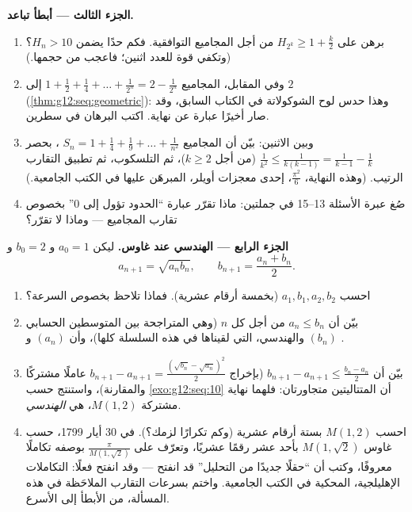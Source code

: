 \begin{problem}
\medskip
\noindent\textbf{الجزء الثالث --- أبطأ تباعد.}
\begin{enumerate}[resume]
  \item برهن  على
        $H_{2^k} \geq 1 + \frac k2$ من أجل المجاميع التوافقية. فكم
        حدًا يضمن $H_n > 10$؟ (وتكفي قوة للعدد اثنين؛
        فاعجب من حجمها.)
  \item وفي المقابل،  المجاميع 
        $1 + \frac12 + \frac14 + \dots + \frac{1}{2^n} =
        2 - \frac{1}{2^n}$ إلى $2$
        (\cref{thm:g12:seq:geometric}): وهذا حدس لوح الشوكولاتة
        في الكتاب السابق، وقد صار أخيرًا عبارة عن
        نهاية. اكتب البرهان في سطرين.
  \item وبين الاثنين: بيّن أن المجاميع
        $S_n = 1 + \frac{1}{4} + \frac{1}{9} + \dots +
        \frac{1}{n^2}$ ، بحصر
        $\frac{1}{k^2} \leq \frac{1}{k(k-1)} =
        \frac{1}{k-1} - \frac{1}{k}$ (من أجل $k \geq 2$)،
        ثم التلسكوب، ثم تطبيق التقارب الرتيب. (وهذه
        النهاية، $\frac{\pi^2}{6}$، إحدى معجزات أويلر،
        المبرهَن عليها في الكتب الجامعية.)
  \item صُغ عبرة الأسئلة 13--15 في جملتين:
        ماذا تقرّر عبارة ``الحدود تؤول إلى $0$'' بخصوص
        تقارب المجاميع --- وماذا لا تقرّر؟
\end{enumerate}

\medskip
\noindent\textbf{الجزء الرابع ---  الهندسي عند
غاوس.}
ليكن $a_0 = 1$ و $b_0 = 2$ و
\[
a_{n+1} = \sqrt{a_n b_n},
\qquad
b_{n+1} = \frac{a_n + b_n}{2} .
\]
\begin{enumerate}[resume]
  \item احسب $a_1, b_1, a_2, b_2$ (بخمسة أرقام عشرية). فماذا
        تلاحظ بخصوص السرعة؟
  \item بيّن أن $a_n \leq b_n$ من أجل كل $n$ (وهي
        المتراجحة بين المتوسطين الحسابي والهندسي، التي لقيناها في هذه
        السلسلة كلها)، وأن $(a_n)$  و $(b_n)$ .
  \item بيّن أن
        $b_{n+1} - a_{n+1} \leq \frac{b_n - a_n}{2}$
        (بإخراج $b_{n+1} - a_{n+1} =
        \frac{(\sqrt{b_n} - \sqrt{a_n})^2}{2}$ عاملًا مشتركًا والمقارنة)،
        واستنتج حسب \cref{exo:g12:seq:10} أن المتتاليتين
        متجاورتان: فلهما نهاية مشتركة
        $M(1, 2)$، هي \emph{ الهندسي}.
  \item احسب $M(1, 2)$ بستة أرقام عشرية (وكم تكرارًا
        لزمك؟). في 30 أيار 1799، حسب غاوس
        $M(1, \sqrt2)$ بأحد عشر رقمًا عشريًا، وتعرّف على
        $\frac{\pi}{M(1,\sqrt2)}$ بوصفه تكاملًا معروفًا،
        وكتب أن ``حقلًا جديدًا من التحليل'' قد انفتح ---
        وقد انفتح فعلًا: التكاملات الإهليلجية، المحكية في الكتب
        الجامعية. واختم بسرعات التقارب الملاحَظة في
        هذه المسألة، من الأبطأ إلى الأسرع.
\end{enumerate}
\end{problem}
